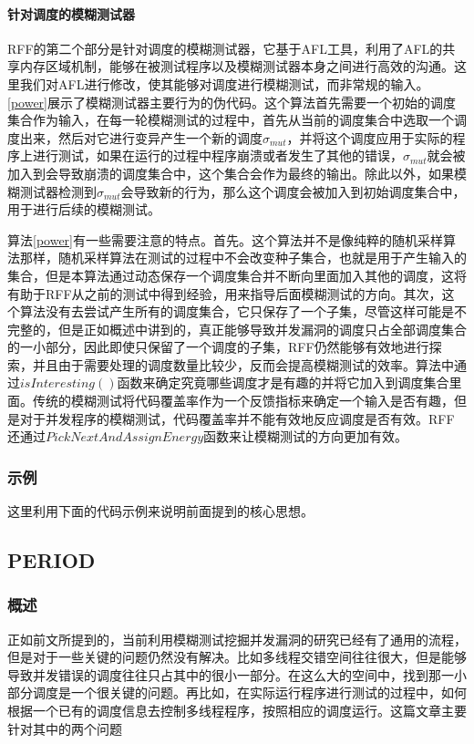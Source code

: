 \paragraph{针对调度的模糊测试器}RFF的第二个部分是针对调度的模糊测试器，它基于AFL工具，利用了AFL的共享内存区域机制，能够在被测试程序以及模糊测试器本身之间进行高效的沟通。这里我们对AFL进行修改，使其能够对调度进行模糊测试，而非常规的输入。\ref{power}展示了模糊测试器主要行为的伪代码。这个算法首先需要一个初始的调度集合作为输入，在每一轮模糊测试的过程中，首先从当前的调度集合中选取一个调度出来，然后对它进行变异产生一个新的调度$\sigma_{mut}$，并将这个调度应用于实际的程序上进行测试，如果在运行的过程中程序崩溃或者发生了其他的错误，$\sigma_{mut}$就会被加入到会导致崩溃的调度集合中，这个集合会作为最终的输出。除此以外，如果模糊测试器检测到$\sigma_{mut}$会导致新的行为，那么这个调度会被加入到初始调度集合中，用于进行后续的模糊测试。

算法\ref{power}有一些需要注意的特点。首先。这个算法并不是像纯粹的随机采样算法那样，随机采样算法在测试的过程中不会改变种子集合，也就是用于产生输入的集合，但是本算法通过动态保存一个调度集合并不断向里面加入其他的调度，这将有助于RFF从之前的测试中得到经验，用来指导后面模糊测试的方向。其次，这个算法没有去尝试产生所有的调度集合，它只保存了一个子集，尽管这样可能是不完整的，但是正如概述中讲到的，真正能够导致并发漏洞的调度只占全部调度集合的一小部分，因此即使只保留了一个调度的子集，RFF仍然能够有效地进行探索，并且由于需要处理的调度数量比较少，反而会提高模糊测试的效率。算法中通过$isInteresting()$函数来确定究竟哪些调度才是有趣的并将它加入到调度集合里面。传统的模糊测试将代码覆盖率作为一个反馈指标来确定一个输入是否有趣，但是对于并发程序的模糊测试，代码覆盖率并不能有效地反应调度是否有效。RFF还通过$PickNextAndAssignEnergy$函数来让模糊测试的方向更加有效。

\subsubsection{示例}

这里利用下面的代码示例来说明前面提到的核心思想。

\subsection{PERIOD}

\subsubsection{概述}

正如前文所提到的，当前利用模糊测试挖掘并发漏洞的研究已经有了通用的流程，但是对于一些关键的问题仍然没有解决。比如多线程交错空间往往很大，但是能够导致并发错误的调度往往只占其中的很小一部分。在这么大的空间中，找到那一小部分调度是一个很关键的问题。再比如，在实际运行程序进行测试的过程中，如何根据一个已有的调度信息去控制多线程程序，按照相应的调度运行。这篇文章主要针对其中的两个问题

